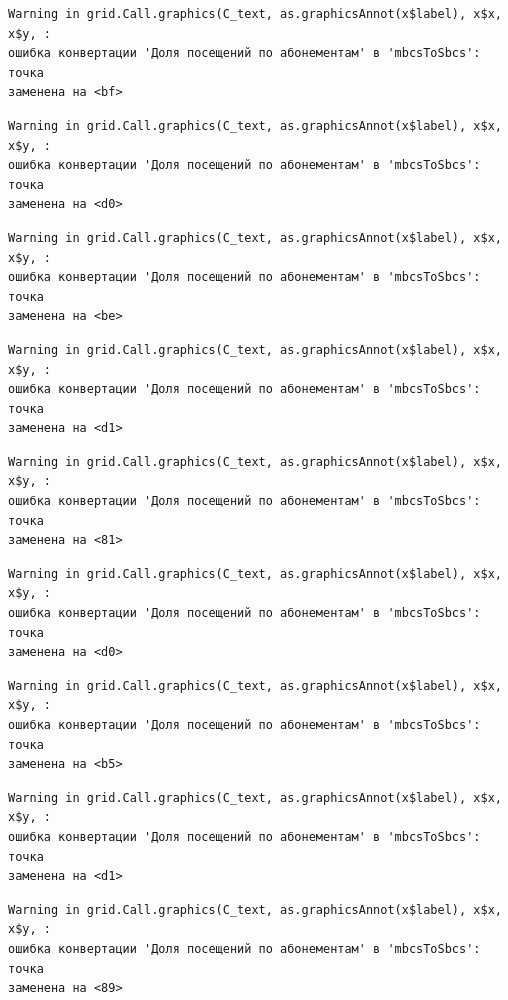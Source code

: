 \documentclass[
  letterpaper,
  DIV=11,
  numbers=noendperiod]{scrreprt}
\begin{document}
\begin{verbatim}
Warning in grid.Call.graphics(C_text, as.graphicsAnnot(x$label), x$x, x$y, :
ошибка конвертации 'Доля посещений по абонементам' в 'mbcsToSbcs': точка
заменена на <bf>
\end{verbatim}

\begin{verbatim}
Warning in grid.Call.graphics(C_text, as.graphicsAnnot(x$label), x$x, x$y, :
ошибка конвертации 'Доля посещений по абонементам' в 'mbcsToSbcs': точка
заменена на <d0>
\end{verbatim}

\begin{verbatim}
Warning in grid.Call.graphics(C_text, as.graphicsAnnot(x$label), x$x, x$y, :
ошибка конвертации 'Доля посещений по абонементам' в 'mbcsToSbcs': точка
заменена на <be>
\end{verbatim}

\begin{verbatim}
Warning in grid.Call.graphics(C_text, as.graphicsAnnot(x$label), x$x, x$y, :
ошибка конвертации 'Доля посещений по абонементам' в 'mbcsToSbcs': точка
заменена на <d1>
\end{verbatim}

\begin{verbatim}
Warning in grid.Call.graphics(C_text, as.graphicsAnnot(x$label), x$x, x$y, :
ошибка конвертации 'Доля посещений по абонементам' в 'mbcsToSbcs': точка
заменена на <81>
\end{verbatim}

\begin{verbatim}
Warning in grid.Call.graphics(C_text, as.graphicsAnnot(x$label), x$x, x$y, :
ошибка конвертации 'Доля посещений по абонементам' в 'mbcsToSbcs': точка
заменена на <d0>
\end{verbatim}

\begin{verbatim}
Warning in grid.Call.graphics(C_text, as.graphicsAnnot(x$label), x$x, x$y, :
ошибка конвертации 'Доля посещений по абонементам' в 'mbcsToSbcs': точка
заменена на <b5>
\end{verbatim}

\begin{verbatim}
Warning in grid.Call.graphics(C_text, as.graphicsAnnot(x$label), x$x, x$y, :
ошибка конвертации 'Доля посещений по абонементам' в 'mbcsToSbcs': точка
заменена на <d1>
\end{verbatim}

\begin{verbatim}
Warning in grid.Call.graphics(C_text, as.graphicsAnnot(x$label), x$x, x$y, :
ошибка конвертации 'Доля посещений по абонементам' в 'mbcsToSbcs': точка
заменена на <89>
\end{verbatim}
\end{document}
